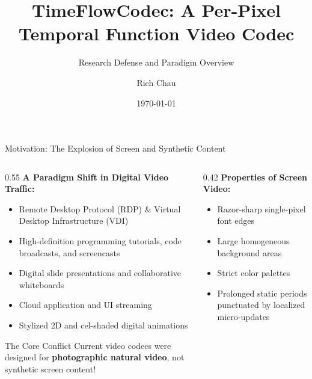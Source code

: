\documentclass[aspectratio=169, 10pt]{beamer}
\title[TimeFlowCodec]{TimeFlowCodec: A Per-Pixel Temporal Function Video Codec}
\subtitle{Research Defense and Paradigm Overview}
\author[Rich Chau]{Rich Chau}
\institute[UC Irvine]{Department of Mathematics \\ University of California, Irvine}
\date{\today}
\begin{document}
\begin{frame}[plain]
    \titlepage
\end{frame}

\begin{frame}{Motivation: The Explosion of Screen and Synthetic Content}
    \begin{columns}
        \begin{column}{0.55\textwidth}
            \textbf{A Paradigm Shift in Digital Video Traffic:}
            \begin{itemize}
                \item Remote Desktop Protocol (RDP) \& Virtual Desktop Infrastructure (VDI)
                \item High-definition programming tutorials, code broadcasts, and screencasts
                \item Digital slide presentations and collaborative whiteboards
                \item Cloud application and UI streaming
                \item Stylized 2D and cel-shaded digital animations
            \end{itemize}
            \vspace{2mm}
            \begin{alertblock}{The Core Conflict}
                Current video codecs were designed for \textbf{photographic natural video}, not synthetic screen content!
            \end{alertblock}
        \end{column}
        \begin{column}{0.42\textwidth}
            \textbf{Properties of Screen Video:}
            \begin{itemize}
                \item Razor-sharp single-pixel font edges
                \item Large homogeneous background areas
                \item Strict color palettes
                \item Prolonged static periods punctuated by localized micro-updates
            \end{itemize}
        \end{column}
    \end{columns}
\end{frame}
\end{document}
